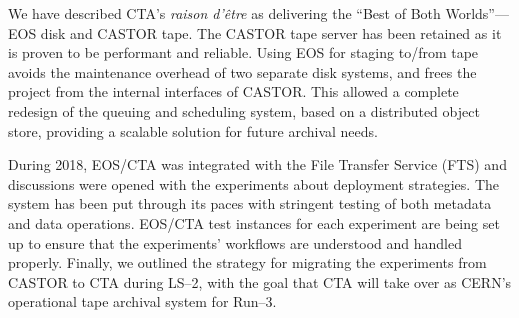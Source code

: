 \documentclass{webofc}
\begin{document}
We have described CTA's \textit{raison d'\^etre} as delivering the ``Best of Both Worlds''---EOS disk
and CASTOR tape. The CASTOR tape server has been retained as it is proven to be performant and reliable. 
Using EOS for staging to/from tape avoids the maintenance overhead of two separate disk systems, and
frees the project from the internal interfaces of CASTOR. This allowed a complete redesign of the
queuing and scheduling system, based on a distributed object store, providing a scalable solution for
future archival needs.

During 2018, EOS/CTA was integrated with the File Transfer Service (FTS) and discussions were opened
with the experiments about deployment strategies. The system has been put through its paces with
stringent testing of both metadata and data operations. EOS/CTA test instances for each experiment
are being set up to ensure that the experiments' workflows are understood and handled
properly. Finally, we outlined the strategy for migrating the experiments from CASTOR to CTA during
LS--2, with the goal that CTA will take over as CERN's operational tape archival system for Run--3.

%
%

\end{document}
